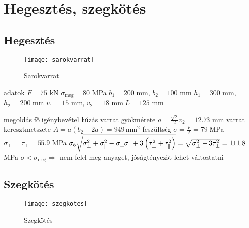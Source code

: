 \section{Hegesztés, szegkötés}

\subsection{Hegesztés}

\begin{wrapfigure}{R}{.5\textwidth}
	\centering
	\vspace{-2cm}
	\texttt{[image: sarokvarrat]}
	\caption{Sarokvarrat}
\end{wrapfigure}
\parbox{.49\textwidth}{
\begin{outline}
	\1 adatok
		\2 $F = 75$ kN
		\2 $\sigma_\text{meg} = 80$ MPa
		\2 $b_1 = 200$ mm, $b_2 = 100$ mm
		\2 $h_1 = 300$ mm, $h_2 = 200$ mm
		\2 $v_1 = 15$ mm, $v_2 = 18$ mm
		\2 $L = 125$ mm
\end{outline}}
\begin{outline}
	\1 megoldás
		\2 fő igénybevétel húzás
		\2 varrat gyökmérete $a = \frac{\sqrt{2}}{2}v_2 = 12.73$ mm
		\2 varrat keresztmetszete $A = a(b_2 - 2a) = 949~\text{mm}^2$
		\2 feszültség $\sigma = \frac{F}{A} = 79$ MPa
		\2 $\sigma_\perp = \tau_\perp = 55.9$ MPa
		\2 $\sigma_\text{ö} \sqrt{\sigma_\perp^2 + \sigma_\parallel^2 - \sigma_\perp\sigma_\parallel + 3\left(\tau_\perp^2+\tau_\parallel^2\right)} = \sqrt{\sigma_\perp^2 + 3\tau_\perp^2} = 111.8$ MPa
		\2 $\sigma<\sigma_\text{meg}\Rightarrow$ nem felel meg
		\2 anyagot, jóságtényezőt lehet változtatni
\end{outline}


\subsection{Szegkötés}

\begin{wrapfigure}{R}{.4\textwidth}
	\centering
	\vspace{-4cm}
	\texttt{[image: szegkotes]}
	\caption{Szegkötés}
\end{wrapfigure}


